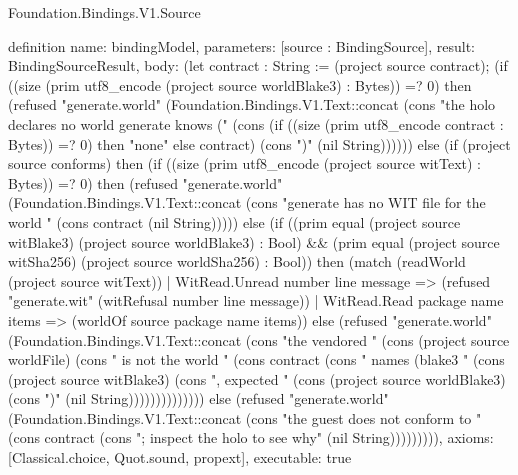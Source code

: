 \begin{lexlean}{Foundation.Bindings.V1.Source}
\begin{semanticmodule}
definition{
  name: bindingModel,
  parameters: [source : BindingSource],
  result: BindingSourceResult,
  body: (let contract : String := (project source contract); (if ((size (prim utf8_encode (project source worldBlake3) : Bytes)) =? 0) then (refused "generate.world" (Foundation.Bindings.V1.Text::concat (cons "the holo declares no world generate knows (" (cons (if ((size (prim utf8_encode contract : Bytes)) =? 0) then "none" else contract) (cons ")" (nil String)))))) else (if (project source conforms) then (if ((size (prim utf8_encode (project source witText) : Bytes)) =? 0) then (refused "generate.world" (Foundation.Bindings.V1.Text::concat (cons "generate has no WIT file for the world " (cons contract (nil String))))) else (if ((prim equal (project source witBlake3) (project source worldBlake3) : Bool) && (prim equal (project source witSha256) (project source worldSha256) : Bool)) then (match (readWorld (project source witText))
    | WitRead.Unread number line message => (refused "generate.wit" (witRefusal number line message))
    | WitRead.Read package name items => (worldOf source package name items)) else (refused "generate.world" (Foundation.Bindings.V1.Text::concat (cons "the vendored " (cons (project source worldFile) (cons " is not the world " (cons contract (cons " names (blake3 " (cons (project source witBlake3) (cons ", expected " (cons (project source worldBlake3) (cons ")" (nil String)))))))))))))) else (refused "generate.world" (Foundation.Bindings.V1.Text::concat (cons "the guest does not conform to " (cons contract (cons "; inspect the holo to see why" (nil String))))))))),
  axioms: [Classical.choice, Quot.sound, propext],
  executable: true
}
\end{semanticmodule}
\end{lexlean}
